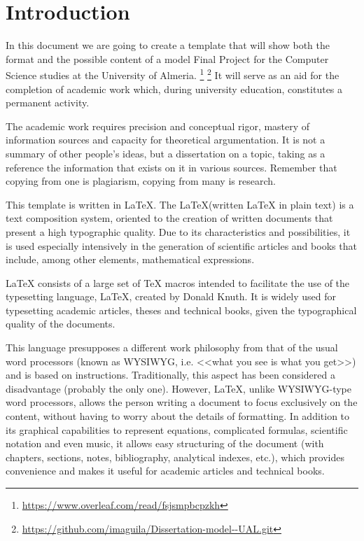 
\chapter {Introduction}
\label{sec:intro}


In this document we are going to create a template that will show both the format and the possible content of a model Final Project for the Computer Science studies at the University of Almeria. \footnote{\url{https://www.overleaf.com/read/fsjsmpbcpzkh}} \footnote{\url{https://github.com/imaguila/Dissertation-model--UAL.git}}
It will serve as an aid for the completion of academic work which, during university education, constitutes a permanent activity.

The academic work requires precision and conceptual rigor, mastery of information sources and capacity for theoretical argumentation.  It is not a summary of other people's ideas, but a dissertation on a topic, taking as a reference the information that exists on it in various sources. Remember that copying from one is plagiarism, copying from many is research. \cite{malaga}

This template is written in \LaTeX.
The \LaTeX (written LaTeX in plain text) is a text composition system, oriented to the creation of written documents that present a high typographic quality. Due to its characteristics and possibilities, it is used especially intensively in the generation of scientific articles and books that include, among other elements, mathematical expressions. \cite{wiki}

LaTeX consists of a large set of TeX macros intended to facilitate the use of the typesetting language, \LaTeX, created by Donald Knuth. It is widely used for typesetting academic articles, theses and technical books, given the typographical quality of the documents. 

This language presupposes a different work philosophy from that of the usual word processors (known as WYSIWYG, i.e. <<what you see is what you get>>) and is based on instructions. Traditionally, this aspect has been considered a disadvantage (probably the only one). However, LaTeX, unlike WYSIWYG-type word processors, allows the person writing a document to focus exclusively on the content, without having to worry about the details of formatting. In addition to its graphical capabilities to represent equations, complicated formulas, scientific notation and even music, it allows easy structuring of the document (with chapters, sections, notes, bibliography, analytical indexes, etc.), which provides convenience and makes it useful for academic articles and technical books.

